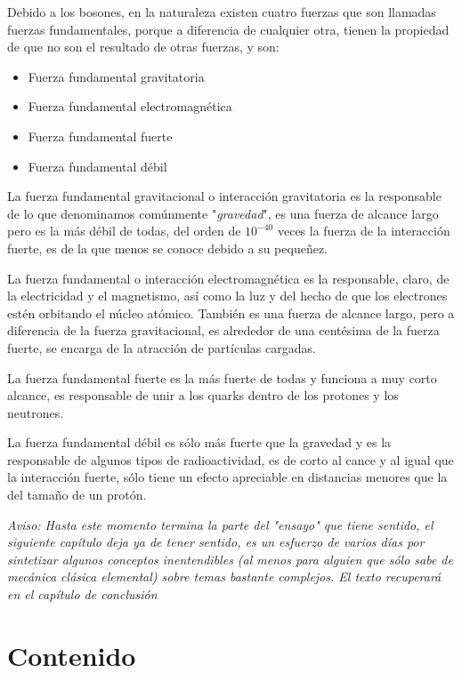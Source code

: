 \documentclass[a4paper,12pt,twoside]{book}
\begin{document}
Debido a los bosones, en la naturaleza existen cuatro fuerzas que son llamadas fuerzas fundamentales, porque a diferencia de cualquier otra, tienen la propiedad de que no son el resultado de otras fuerzas, y son:
\begin{itemize}
\item Fuerza fundamental gravitatoria
\item Fuerza fundamental electromagnética
\item Fuerza fundamental fuerte
\item Fuerza fundamental débil

\end{itemize}

La fuerza fundamental gravitacional o interacción gravitatoria es la responsable de lo que denominamos comúnmente "\textit{gravedad}", es una fuerza de alcance largo pero es la más débil de todas, del orden de $10^{-40}$ veces la fuerza de la interacción fuerte, es de la que menos se conoce debido a su pequeñez.

La fuerza fundamental o interacción electromagnética es la responsable, claro, de la electricidad y el magnetismo, así como la luz y del hecho de que los electrones estén orbitando el núcleo atómico. También es una fuerza de alcance largo, pero a diferencia de la fuerza gravitacional, es alrededor de una centésima de la fuerza fuerte, se encarga de la atracción de partículas cargadas.

La fuerza fundamental fuerte es la más fuerte de todas y funciona a muy corto alcance, es responsable de unir a los quarks dentro de los protones y los neutrones.

La fuerza fundamental débil es sólo más fuerte que la gravedad y es la responsable de algunos tipos de radioactividad, es de corto al cance y al igual que la interacción fuerte, sólo tiene un efecto apreciable en distancias menores que la del tamaño de un protón.
\begin{center}
\textit{Aviso: Hasta este momento termina la parte del "ensayo" que tiene sentido, el siguiente capítulo deja ya de tener sentido,  es un esfuerzo de varios días por sintetizar algunos conceptos inentendibles (al menos para alguien que sólo sabe de mecánica clásica elemental) sobre temas bastante complejos. El texto recuperará en el capítulo de conclusión}
\end{center}


\chapter{Contenido}\label{cap.contenido}
\end{document}
